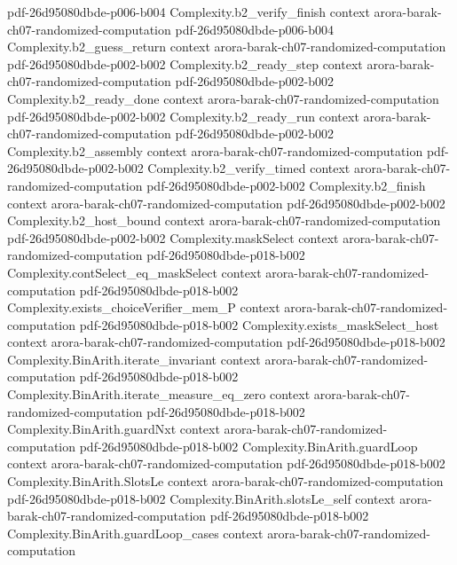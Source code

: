 \begin{theorem}
  {pdf-26d95080dbde-p006-b004}
\proofstep
  {Complexity.b2_verify_finish}
  {context}
  {arora-barak-ch07-randomized-computation}
  {pdf-26d95080dbde-p006-b004}
\proofstep
  {Complexity.b2_guess_return}
  {context}
  {arora-barak-ch07-randomized-computation}
  {pdf-26d95080dbde-p002-b002}
\proofstep
  {Complexity.b2_ready_step}
  {context}
  {arora-barak-ch07-randomized-computation}
  {pdf-26d95080dbde-p002-b002}
\proofstep
  {Complexity.b2_ready_done}
  {context}
  {arora-barak-ch07-randomized-computation}
  {pdf-26d95080dbde-p002-b002}
\proofstep
  {Complexity.b2_ready_run}
  {context}
  {arora-barak-ch07-randomized-computation}
  {pdf-26d95080dbde-p002-b002}
\proofstep
  {Complexity.b2_assembly}
  {context}
  {arora-barak-ch07-randomized-computation}
  {pdf-26d95080dbde-p002-b002}
\proofstep
  {Complexity.b2_verify_timed}
  {context}
  {arora-barak-ch07-randomized-computation}
  {pdf-26d95080dbde-p002-b002}
\proofstep
  {Complexity.b2_finish}
  {context}
  {arora-barak-ch07-randomized-computation}
  {pdf-26d95080dbde-p002-b002}
\proofstep
  {Complexity.b2_host_bound}
  {context}
  {arora-barak-ch07-randomized-computation}
  {pdf-26d95080dbde-p002-b002}
\proofstep
  {Complexity.maskSelect}
  {context}
  {arora-barak-ch07-randomized-computation}
  {pdf-26d95080dbde-p018-b002}
\proofstep
  {Complexity.contSelect_eq_maskSelect}
  {context}
  {arora-barak-ch07-randomized-computation}
  {pdf-26d95080dbde-p018-b002}
\proofstep
  {Complexity.exists_choiceVerifier_mem_P}
  {context}
  {arora-barak-ch07-randomized-computation}
  {pdf-26d95080dbde-p018-b002}
\proofstep
  {Complexity.exists_maskSelect_host}
  {context}
  {arora-barak-ch07-randomized-computation}
  {pdf-26d95080dbde-p018-b002}
\proofstep
  {Complexity.BinArith.iterate_invariant}
  {context}
  {arora-barak-ch07-randomized-computation}
  {pdf-26d95080dbde-p018-b002}
\proofstep
  {Complexity.BinArith.iterate_measure_eq_zero}
  {context}
  {arora-barak-ch07-randomized-computation}
  {pdf-26d95080dbde-p018-b002}
\proofstep
  {Complexity.BinArith.guardNxt}
  {context}
  {arora-barak-ch07-randomized-computation}
  {pdf-26d95080dbde-p018-b002}
\proofstep
  {Complexity.BinArith.guardLoop}
  {context}
  {arora-barak-ch07-randomized-computation}
  {pdf-26d95080dbde-p018-b002}
\proofstep
  {Complexity.BinArith.SlotsLe}
  {context}
  {arora-barak-ch07-randomized-computation}
  {pdf-26d95080dbde-p018-b002}
\proofstep
  {Complexity.BinArith.slotsLe_self}
  {context}
  {arora-barak-ch07-randomized-computation}
  {pdf-26d95080dbde-p018-b002}
\proofstep
  {Complexity.BinArith.guardLoop_cases}
  {context}
  {arora-barak-ch07-randomized-computation}

\end{theorem}
